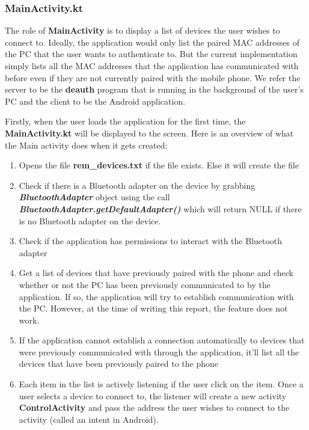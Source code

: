 \documentclass[letterpaper,twocolumn,10pt]{article}
\begin{document}
{{\subsubsection{MainActivity.kt}
The role of \textbf{MainActivity} is to display a list of devices the user wishes to connect to. Ideally, the application would only list the paired MAC addresses of the PC that the user wants to authenticate to. But the current implementation simply lists all the MAC addresses that the application has communicated with before even if they are not currently paired with the mobile phone. We refer the server to be the \textbf{deauth} program that is running in the background of the user's PC and the client to be the Android application.

Firstly, when the user loads the application for the first time, the \textbf{MainActivity.kt} will be displayed to the screen. Here is an overview of what the Main activity does when it gets created:
\begin{enumerate}
\item Opens the file \textbf{rem\_devices.txt} if the file exists. Else it will create the file

\item Check if there is a Bluetooth adapter on the device by grabbing \textbf{\emph{BluetoothAdapter}} object using the call \textbf{\emph{BluetoothAdapter.getDefaultAdapter()}} which will return NULL if there is no Bluetooth adapter on the device.

\item Check if the application has permissions to interact with the Bluetooth adapter

\item Get a list of devices that have previously paired with the phone and check whether or not the PC has been previously communicated to by the application. If so, the application will try to establish communication with the PC. However, at the time of writing this report, the feature does not work.

\item If the application cannot establish a connection automatically to devices that were previously communicated with through the application, it'll list all the devices that have been previously paired to the phone

\item Each item in the list is actively listening if the user click on the item. Once a user selects a device to connect to, the listener will create a new activity \textbf{ControlActivity} and pass the address the user wishes to connect to the activity (called an intent in Android).
\end{enumerate}

}}
\end{document}
